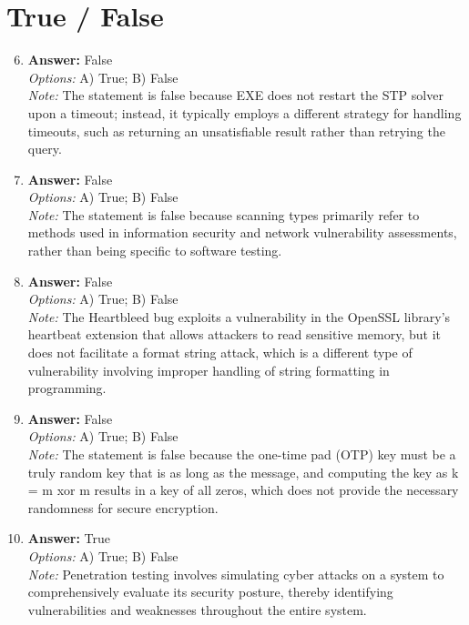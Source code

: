 \documentclass[12pt]{article}
\begin{document}
\section*{True / False}
\begin{enumerate}[label=\arabic*.]
\setcounter{enumi}{5}
\item \textbf{Answer:} False
\\ \textit{Options:} A) True; B) False
\\ \textit{Note:} The statement is false because EXE does not restart the STP solver upon a timeout; instead, it typically employs a different strategy for handling timeouts, such as returning an unsatisfiable result rather than retrying the query.
\item \textbf{Answer:} False
\\ \textit{Options:} A) True; B) False
\\ \textit{Note:} The statement is false because scanning types primarily refer to methods used in information security and network vulnerability assessments, rather than being specific to software testing.
\item \textbf{Answer:} False
\\ \textit{Options:} A) True; B) False
\\ \textit{Note:} The Heartbleed bug exploits a vulnerability in the OpenSSL library's heartbeat extension that allows attackers to read sensitive memory, but it does not facilitate a format string attack, which is a different type of vulnerability involving improper handling of string formatting in programming.
\item \textbf{Answer:} False
\\ \textit{Options:} A) True; B) False
\\ \textit{Note:} The statement is false because the one-time pad (OTP) key must be a truly random key that is as long as the message, and computing the key as k = m xor m results in a key of all zeros, which does not provide the necessary randomness for secure encryption.
\item \textbf{Answer:} True
\\ \textit{Options:} A) True; B) False
\\ \textit{Note:} Penetration testing involves simulating cyber attacks on a system to comprehensively evaluate its security posture, thereby identifying vulnerabilities and weaknesses throughout the entire system.
\end{enumerate}
\end{document}
